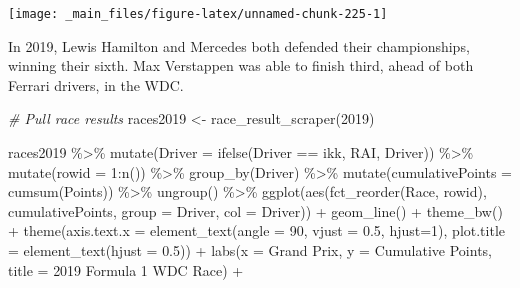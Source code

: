 \documentclass[
]{book}
\newenvironment{Shaded}{\begin{snugshade}}{\end{snugshade}}
\newcommand{\AttributeTok}[1]{\textcolor[rgb]{0.77,0.63,0.00}{#1}}
\newcommand{\CommentTok}[1]{\textcolor[rgb]{0.56,0.35,0.01}{\textit{#1}}}
\newcommand{\DecValTok}[1]{\textcolor[rgb]{0.00,0.00,0.81}{#1}}
\newcommand{\FloatTok}[1]{\textcolor[rgb]{0.00,0.00,0.81}{#1}}
\newcommand{\FunctionTok}[1]{\textcolor[rgb]{0.00,0.00,0.00}{#1}}
\newcommand{\NormalTok}[1]{#1}
\newcommand{\OtherTok}[1]{\textcolor[rgb]{0.56,0.35,0.01}{#1}}
\newcommand{\SpecialCharTok}[1]{\textcolor[rgb]{0.00,0.00,0.00}{#1}}
\newcommand{\StringTok}[1]{\textcolor[rgb]{0.31,0.60,0.02}{#1}}
\begin{document}
\begin{center}\texttt{[image: \_main\_files/figure-latex/unnamed-chunk-225-1]} \end{center}

In 2019, Lewis Hamilton and Mercedes both defended their championships, winning their sixth. Max Verstappen was able to finish third, ahead of both Ferrari drivers, in the WDC.

\begin{Shaded}
\begin{Highlighting}[]
\CommentTok{\# Pull race results}
\NormalTok{races2019 }\OtherTok{\textless{}{-}} \FunctionTok{race\_result\_scraper}\NormalTok{(}\DecValTok{2019}\NormalTok{)}

\NormalTok{races2019 }\SpecialCharTok{\%\textgreater{}\%}
  \FunctionTok{mutate}\NormalTok{(}\AttributeTok{Driver =} \FunctionTok{ifelse}\NormalTok{(Driver }\SpecialCharTok{==} \StringTok{\textquotesingle{}ikk\textquotesingle{}}\NormalTok{, }\StringTok{\textquotesingle{}RAI\textquotesingle{}}\NormalTok{, Driver)) }\SpecialCharTok{\%\textgreater{}\%} 
  \FunctionTok{mutate}\NormalTok{(}\AttributeTok{rowid =} \DecValTok{1}\SpecialCharTok{:}\FunctionTok{n}\NormalTok{()) }\SpecialCharTok{\%\textgreater{}\%}
  \FunctionTok{group\_by}\NormalTok{(Driver) }\SpecialCharTok{\%\textgreater{}\%} 
  \FunctionTok{mutate}\NormalTok{(}\AttributeTok{cumulativePoints =} \FunctionTok{cumsum}\NormalTok{(Points)) }\SpecialCharTok{\%\textgreater{}\%}
  \FunctionTok{ungroup}\NormalTok{() }\SpecialCharTok{\%\textgreater{}\%} 
  \FunctionTok{ggplot}\NormalTok{(}\FunctionTok{aes}\NormalTok{(}\FunctionTok{fct\_reorder}\NormalTok{(Race, rowid), cumulativePoints,}
         \AttributeTok{group =}\NormalTok{ Driver, }\AttributeTok{col =}\NormalTok{ Driver)) }\SpecialCharTok{+}
  \FunctionTok{geom\_line}\NormalTok{() }\SpecialCharTok{+}
  \FunctionTok{theme\_bw}\NormalTok{() }\SpecialCharTok{+} 
  \FunctionTok{theme}\NormalTok{(}\AttributeTok{axis.text.x =} \FunctionTok{element\_text}\NormalTok{(}\AttributeTok{angle =} \DecValTok{90}\NormalTok{, }\AttributeTok{vjust =} \FloatTok{0.5}\NormalTok{, }\AttributeTok{hjust=}\DecValTok{1}\NormalTok{),}
        \AttributeTok{plot.title =} \FunctionTok{element\_text}\NormalTok{(}\AttributeTok{hjust =} \FloatTok{0.5}\NormalTok{)) }\SpecialCharTok{+}
  \FunctionTok{labs}\NormalTok{(}\AttributeTok{x =} \StringTok{\textquotesingle{}Grand Prix\textquotesingle{}}\NormalTok{,}
       \AttributeTok{y =} \StringTok{\textquotesingle{}Cumulative Points\textquotesingle{}}\NormalTok{,}
       \AttributeTok{title =} \StringTok{\textquotesingle{}2019 Formula 1 WDC Race\textquotesingle{}}\NormalTok{) }\SpecialCharTok{+}

\end{Highlighting}
\end{Shaded}
\end{document}
